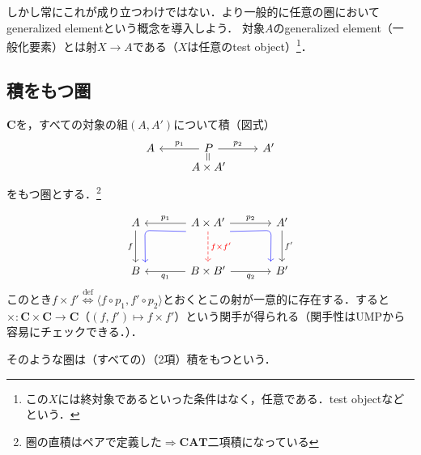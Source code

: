 \documentclass[dvipdfmx,a4j,10pt]{jsarticle}
\theoremstyle{mystyle1}
\theoremstyle{mystyle2}
\newcommand{\defLeftrightarrow}{\overset{\text{def}}{\iff}}
\begin{document}
しかし常にこれが成り立つわけではない．より一般的に任意の圏においてgeneralized elementという概念を導入しよう．
対象$A$のgeneralized element（一般化要素）とは射$X\to A$である（$X$は任意のtest object）\footnote{この$X$には終対象であるといった条件はなく，任意である．test objectなどという．}．


\subsection{積をもつ圏}

$\mathbf{C}$を，すべての対象の組$(A,A')$について積（図式）
\begin{equation}
	\begin{tikzcd}[row sep=0.4ex]
		A & P \arrow[l,"p_1"'] \arrow[r,"p_2"] \arrow[d,phantom,"\rotatebox{90}{$=$}"]& A' \\
		& A\times A' &
	\end{tikzcd}
\end{equation}
をもつ圏とする．\footnote{圏の直積はペアで定義した$\Rightarrow\mathbf{CAT}$二項積になっている}

\begin{equation}
	\begin{tikzcd}[row sep=large,column sep=large]
		|[alias=A]| A \arrow[d,"f"'] & A\times A' \arrow[l,"p_1"'] \arrow[r,"p_2"]
		\arrow[ld,blue,rounded corners,to path={(\tikztostart.south west)--(A.south east)--(\tikztotarget.north east)}]
		\arrow[rd,blue,rounded corners,to path={(\tikztostart.south east)--(Ad.south west)--(\tikztotarget.north west)}]
		\arrow[d,red,dashed,"f\times f'"] & |[alias=Ad]| A' \arrow[d,"f'"] \\
		B & B\times B' \arrow[l,"q_1"] \arrow[r,"q_2"'] & B'
	\end{tikzcd}
\end{equation}
このとき$f\times f'\defLeftrightarrow \langle f\circ p_1,f'\circ p_2\rangle$とおくとこの射が一意的に存在する．すると$\times:\mathbf{C}\times\mathbf{C}\to \mathbf{C}$（$(f,f')\mapsto f\times f'$）という関手が得られる（関手性はUMPから容易にチェックできる．）．

そのような圏は（すべての）（2項）積をもつという．
\end{document}
